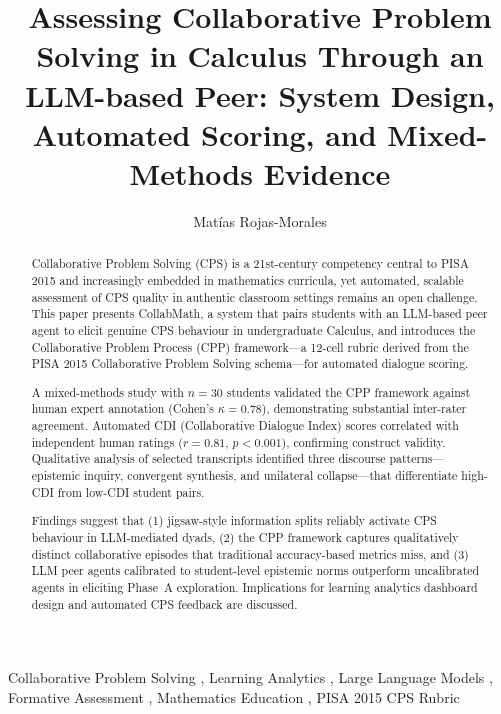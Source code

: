 \documentclass[review,12pt]{elsarticle}
\begin{document}
\begin{frontmatter}

\title{Assessing Collaborative Problem Solving in Calculus Through an
  LLM-based Peer: System Design, Automated Scoring, and
  Mixed-Methods Evidence}

\author[uga]{Mat\'{i}as Rojas-Morales}
\address[uga]{University of Georgia, Athens, GA, USA}

\begin{abstract}
Collaborative Problem Solving (CPS) is a 21st-century competency
central to PISA 2015 and increasingly embedded in mathematics curricula,
yet automated, scalable assessment of CPS quality in authentic classroom
settings remains an open challenge.  This paper presents CollabMath, a
system that pairs students with an LLM-based peer agent to elicit
genuine CPS behaviour in undergraduate Calculus, and introduces the
Collaborative Problem Process (CPP) framework---a 12-cell rubric derived
from the PISA 2015 Collaborative Problem Solving schema---for automated
dialogue scoring.

A mixed-methods study with $n=30$ students validated the CPP framework
against human expert annotation (Cohen's $\kappa = 0.78$), demonstrating
substantial inter-rater agreement.  Automated CDI (Collaborative
Dialogue Index) scores correlated with independent human ratings
($r = 0.81$, $p < 0.001$), confirming construct validity.  Qualitative
analysis of selected transcripts identified three discourse patterns---
epistemic inquiry, convergent synthesis, and unilateral collapse---that
differentiate high-CDI from low-CDI student pairs.

Findings suggest that (1) jigsaw-style information splits reliably
activate CPS behaviour in LLM-mediated dyads, (2) the CPP framework
captures qualitatively distinct collaborative episodes that traditional
accuracy-based metrics miss, and (3) LLM peer agents calibrated to
student-level epistemic norms outperform uncalibrated agents in
eliciting Phase~A exploration.  Implications for learning analytics
dashboard design and automated CPS feedback are discussed.
\end{abstract}

\begin{keyword}
  Collaborative Problem Solving \sep
  Learning Analytics \sep
  Large Language Models \sep
  Formative Assessment \sep
  Mathematics Education \sep
  PISA 2015 CPS Rubric
\end{keyword}

\end{frontmatter}
\end{document}
